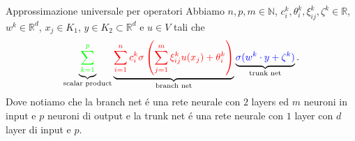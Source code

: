 \documentclass[aspectratio=169]{beamer}
\newcommand{\numberset}{\mathbb}
\newcommand{\N}{\numberset{N}}
\newcommand{\R}{\numberset{R}}
\begin{document}
\begin{frame}{Approssimazione universale per operatori}
    Abbiamo $ n, p, m \in \N $, $ c_i^k, \theta_i^k, \xi_{ij}^k, \zeta^k \in \R $, $ w^k \in \R^d $, $ x_j \in K_1 $, $y\in K_2 \subset \R^{d}$ e $u \in V$ tali che
    \begin{equation}
        \underbrace{{\color{green}\sum_{k=1}^{p}}}_{{}\text{scalar product}} \underbrace{{\color{red} \sum_{i=1}^{n}c_i^k \sigma \left( \sum_{j=1}^{m} \xi_{ij}^k u(x_j) + \theta_i^k \right)}}_{{}\text{branch net}} \underbrace{{\color{blue} \sigma(w^k \cdot y + \zeta^k)}}_{{}\text{trunk net}}.
    \end{equation}
    \pause
    Dove notiamo che la branch net \'e una rete neurale con $2$ layers ed $ m $ neuroni in input e $p$ neuroni di output e la trunk net \'e una rete neurale con $1$ layer con $d$ layer di input e $p$.
\end{frame}
\end{document}
